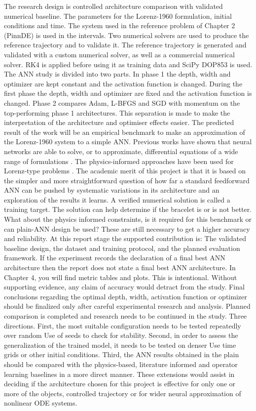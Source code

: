 The research design is controlled architecture comparison with validated numerical baseline. The parameters for the Lorenz-1960 formulation, initial conditions and time. The system used in the reference problem of Chapter 2 (PinnDE) is used in the intervals. Two numerical solvers are used to produce the reference trajectory and to validate it. The reference trajectory is generated and validated with a custom numerical solver, as well as a commercial numerical solver. RK4 is applied before using it as training data and SciPy DOP853 is used. The ANN study is divided into two parts. In phase 1 the depth, width and optimizer are kept constant and the activation function is changed. During the first phase the depth, width and optimizer are fixed and the activation function is changed. Phase 2 compares Adam, L-BFGS and SGD with momentum on the top-performing phase 1 architectures. This separation is made to make the interpretation of the architecture and optimiser effects easier. The predicted result of the work will be an empirical benchmark to make an approximation of the Lorenz-1960 system to a simple ANN. Previous works have shown that neural networks are able to solve, or to approximate, differential equations of a wide range of formulations \cite{mall2013comparison, okereke2021novel, dubey2024solving}. The physics-informed approaches have been used for Lorenz-type problems  \cite{matthews2024pinnde, aslam2024neuro}. The academic merit of this project is that it is based on the simpler and more straightforward question of how far a standard feedforward ANN can be pushed by systematic variations in its architecture and an exploration of the results it learns. A verified numerical solution is called a training target. The solution can help determine if the bracelet is or is not better. What about the physics informed constraints, is it required for this benchmark or can plain-ANN design be used? These are still necessary to get a higher accuracy and reliability. At this report stage the supported contribution is: The validated baseline design, the dataset and training protocol, and the planned evaluation framework. If the experiment records the declaration of a final best ANN architecture then the report does not state a final best ANN architecture. In Chapter 4, you will find metric tables and plots. This is intentional. Without supporting evidence, any claim of accuracy would detract from the study. Final conclusions regarding the optimal depth, width, activation function or optimizer should be finalized only after careful experimental research and analysis. Planned comparison is completed and research needs to be continued in the study. Three directions. First, the most suitable configuration needs to be tested repeatedly over random Use of seeds to check for stability. Second, in order to assess the generalization of the trained model, it needs to be tested on denser Use time grids or other initial conditions. Third, the ANN results obtained in the plain should be compared with the physics-based, literature informed and operator learning baselines in a more direct manner. These extensions would assist in deciding if the architecture chosen for this project is effective for only one or more of the objects, controlled trajectory or for wider neural approximation of nonlinear ODE systems.
